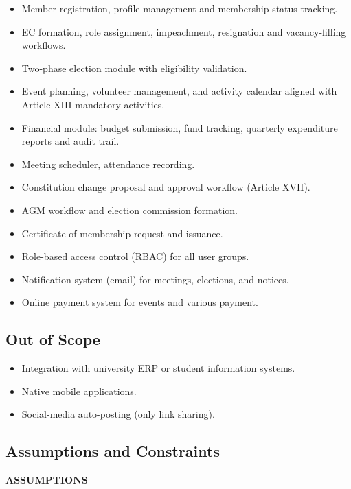 \documentclass[12pt,a4paper]{article}
\begin{document}
\begin{itemize}[noitemsep]
  \item Member registration, profile management and membership-status tracking.
  \item EC formation, role assignment, impeachment, resignation and vacancy-filling workflows.
  \item Two-phase election module with eligibility validation.
  \item Event planning, volunteer management, and activity calendar aligned with Article XIII mandatory activities.
  \item Financial module: budget submission, fund tracking, quarterly expenditure reports and audit trail.
  \item Meeting scheduler, attendance recording.
  \item Constitution change proposal and approval workflow (Article XVII).
  \item AGM workflow and election commission formation.
  \item Certificate-of-membership request and issuance.
  \item Role-based access control (RBAC) for all user groups.
  \item Notification system (email) for meetings, elections, and notices.
  \item Online payment system for events and various payment.
\end{itemize}

\subsection{Out of Scope}

\begin{itemize}[noitemsep]
  \item Integration with university ERP or student information systems.
  \item Native mobile applications.
  \item Social-media auto-posting (only link sharing).
\end{itemize}

\subsection{Assumptions and Constraints}
\textbf{\small\color{Teal}ASSUMPTIONS}\vspace{4pt}
\end{document}
